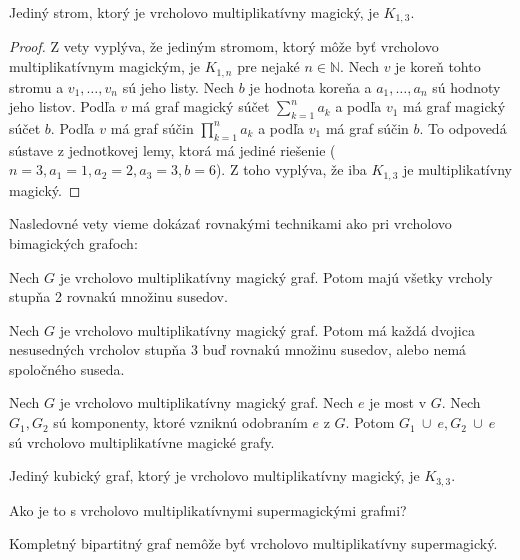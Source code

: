 \begin{consequence} Jediný strom, ktorý je vrcholovo multiplikatívny magický, je $K_{1,3}$.
\end{consequence}

\begin{proof} Z vety \label{vmmgdegree1} vyplýva, že jediným stromom, ktorý môže byť vrcholovo multiplikatívnym magickým, je $K_{1,n}$ pre nejaké $n \in \mathbb{N}$. Nech $v$ je koreň tohto stromu a $v_1, \dots , v_n$ sú jeho listy. Nech $b$ je hodnota koreňa a $a_1, \dots , a_n$ sú hodnoty jeho listov. Podľa $v$ má graf magický súčet $\sum_{k=1}^{n} a_k$ a podľa $v_1$ má graf magický súčet $b$. Podľa $v$ má graf súčin $\prod_{k=1}^{n} a_k$ a podľa $v_1$ má graf súčin $b$. To odpovedá sústave z jednotkovej lemy, ktorá má jediné riešenie ($n = 3, a_1 = 1, a_2 = 2, a_3 = 3, b = 6$). Z toho vyplýva, že iba $K_{1,3}$ je multiplikatívny magický.
\end{proof}

Nasledovné vety vieme dokázať rovnakými technikami ako pri vrcholovo bimagických grafoch:

\begin{theorem} Nech $G$ je vrcholovo multiplikatívny magický graf. Potom majú všetky vrcholy stupňa 2 rovnakú množinu susedov.
\end{theorem}

\begin{theorem} Nech $G$ je vrcholovo multiplikatívny magický graf. Potom má každá dvojica nesusedných vrcholov stupňa 3 buď rovnakú množinu susedov, alebo nemá spoločného suseda.
\end{theorem}

\begin{theorem} Nech $G$ je vrcholovo multiplikatívny magický graf. Nech $e$ je most v $G$. Nech $G_1, G_2$ sú komponenty, ktoré vzniknú odobraním $e$ z $G$. Potom $G_1 ~\cup~ e, G_2 ~\cup~ e$ sú vrcholovo multiplikatívne magické grafy. 
\end{theorem}

\begin{theorem} Jediný kubický graf, ktorý je vrcholovo multiplikatívny magický, je $K_{3,3}$.
\end{theorem}

Ako je to s vrcholovo multiplikatívnymi supermagickými grafmi?

\begin{theorem} Kompletný bipartitný graf nemôže byť vrcholovo multiplikatívny supermagický.
\end{theorem}

